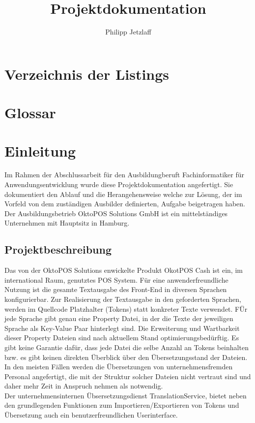 \documentclass[oneside]{article}
\author{Philipp Jetzlaff}
\title{Projektdokumentation}
\renewcommand{\listfigurename}{Abbildungsverzeichnis}
\begin{document}
  \pagestyle{fancy}
  
  \tableofcontents
  \addcontentsline{toc}{section}{\listfigurename}
  \listoffigures
  \listoftables
  \newpage
  \section{Verzeichnis der Listings}
  \newpage
  \section{Glossar}
  \newpage
  \section{Einleitung}
    Im Rahmen der Abschlussarbeit für den Ausbildungberuft Fachinformatiker für Anwendungsentwicklung 
    wurde diese Projektdokumentation angefertigt. Sie dokumentiert den Ablauf und die Herangehensweise 
    welche zur Lösung, der im Vorfeld von dem zuständigen Ausbilder definierten, Aufgabe beigetragen haben. 
    Der Ausbildungsbetrieb OktoPOS Solutions GmbH ist ein mittelständiges Unternehmen mit Hauptsitz in Hamburg.
  \subsection{Projektbeschreibung}
    Das von der OktoPOS Solutions enwickelte Produkt OkotPOS Cash ist ein, im international Raum, genutztes POS System. 
    Für eine anwenderfreundliche Nutzung ist die gesamte Textausgabe des Front-End in diversen Sprachen konfigurierbar. Zur Realisierung der Textausgabe in 
    den geforderten Sprachen, werden im Quellcode Platzhalter (Tokens) statt konkreter Texte verwendet. 
    FÜr jede Sprache gibt genau eine Property Datei, in der die Texte der jeweiligen Sprache als Key-Value Paar hinterlegt sind.
    Die Erweiterung und Wartbarkeit dieser Property Dateien sind nach aktuellem Stand optimierungsbedürftig. 
    Es gibt keine Garantie dafür, dass jede Datei die selbe Anzahl an Tokens beinhalten bzw. es gibt keinen direkten Überblick über den Übersetzungsstand der Dateien. 
    In den meisten Fällen werden die Übersetzungen von unternehmensfremden Personal angefertigt, die mit der Struktur solcher Dateien nicht vertraut sind und daher mehr Zeit in Anspruch nehmen als notwendig.\\
    Der unternehmensinternen Übsersetzungsdienst TranslationService, bietet neben den grundlegenden Funktionen zum Importieren/Exportieren von Tokens und Übersetzung auch ein benutzerfreundlichen Userinterface.
\end{document}
